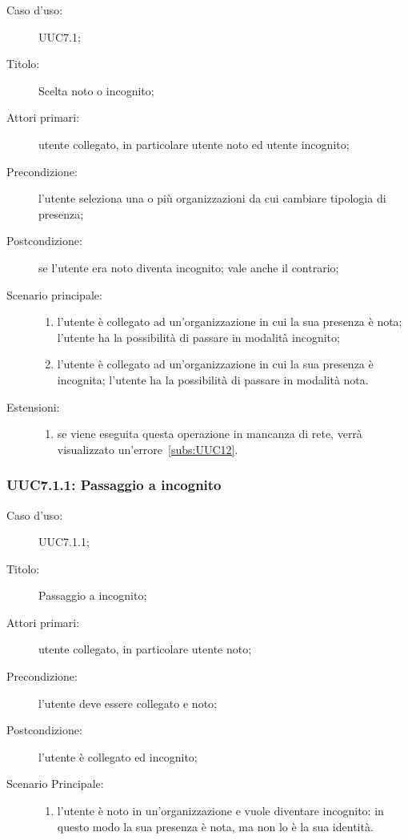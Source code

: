 \documentclass[../../../analisi-dei-requisiti.tex]{subfiles}
\begin{document}
\begin{description}
  \item[Caso d’uso:] UUC7.1;
  \item[Titolo:] Scelta noto o incognito;
  \item[Attori primari:] utente collegato, in particolare utente noto ed utente incognito;
  \item[Precondizione:] l'utente seleziona una o più organizzazioni da cui cambiare tipologia di presenza;
  \item[Postcondizione:] se l'utente era noto diventa incognito; vale anche il contrario;
  \item[Scenario principale:]
        \begin{enumerate}
          \item l'utente è collegato ad un'organizzazione in cui la sua presenza è nota; l'utente ha la possibilità di passare in modalità incognito;
          \item l'utente è collegato ad un'organizzazione in cui la sua presenza è incognita; l'utente ha la possibilità di passare in modalità nota.
        \end{enumerate}
  \item[Estensioni:]
        \begin{enumerate}
          \item se viene eseguita questa operazione in mancanza di rete, verrà visualizzato un'errore~\ref{subs:UUC12}.
        \end{enumerate}
\end{description}

\subsubsection{UUC7.1.1: Passaggio a incognito}%
\label{subs:UUC7.1.1}
\begin{description}
  \item[Caso d’uso:] UUC7.1.1;
  \item[Titolo:] Passaggio a incognito;
  \item[Attori primari:] utente collegato, in particolare utente noto;
  \item[Precondizione:] l'utente deve essere collegato e noto;
  \item[Postcondizione:] l'utente è collegato ed incognito;
  \item[Scenario Principale:]
        \begin{enumerate}
          \item l'utente è noto in un'organizzazione e vuole diventare incognito: in questo modo la sua presenza è nota, ma non lo è la sua identità.
        \end{enumerate}
\end{description}
\end{document}
